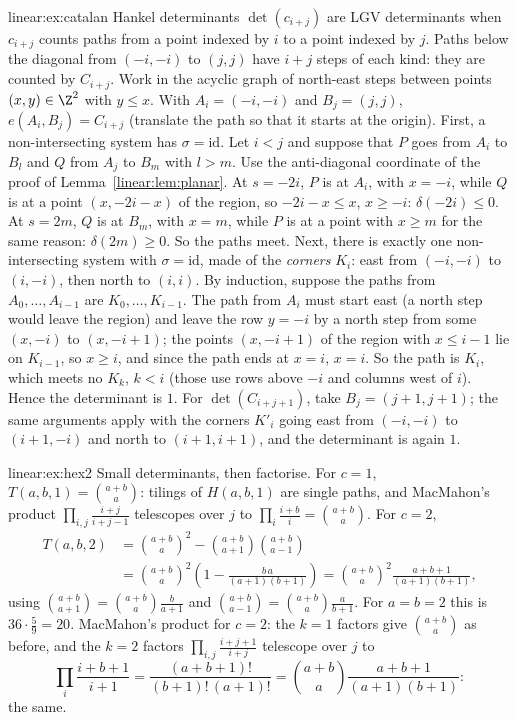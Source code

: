\begin{solution}{linear:ex:catalan}
\idea Hankel determinants $\det(c_{i+j})$ are LGV determinants when $c_{i+j}$ counts paths from a point indexed by $i$ to a
point indexed by $j$. Paths below the diagonal from $(-i,-i)$ to $(j,j)$ have $i+j$ steps of each kind: they are counted
by $C_{i+j}$.
\writeup Work in the acyclic graph of north-east steps between points $(x,y)\in\Z^2$ with $y\le x$. With $A_i=(-i,-i)$ and
$B_j=(j,j)$, $e(A_i,B_j)=C_{i+j}$ (translate the path so that it starts at the origin). First, a non-intersecting system
has $\sigma=\mathrm{id}$. Let $i<j$ and suppose that $P$ goes from $A_i$ to $B_l$ and $Q$ from $A_j$ to $B_m$ with $l>m$.
Use the anti-diagonal coordinate of the proof of Lemma~\ref{linear:lem:planar}. At $s=-2i$, $P$ is at $A_i$, with $x=-i$, while $Q$
is at a point $(x,-2i-x)$ of the region, so $-2i-x\le x$, $x\ge-i$: $\delta(-2i)\le0$. At $s=2m$, $Q$ is at $B_m$, with $x=m$,
while $P$ is at a point with $x\ge m$ for the same reason: $\delta(2m)\ge0$. So the paths meet. Next, there is exactly one
non-intersecting system with $\sigma=\mathrm{id}$, made of the \emph{corners} $K_i$: east from $(-i,-i)$ to $(i,-i)$, then north
to $(i,i)$. By induction, suppose the paths from $A_0,\dots,A_{i-1}$ are $K_0,\dots,K_{i-1}$. The path from $A_i$ must start
east (a north step would leave the region) and leave the row $y=-i$ by a north step from some $(x,-i)$ to $(x,-i+1)$; the
points $(x,-i+1)$ of the region with $x\le i-1$ lie on $K_{i-1}$, so $x\ge i$, and since the path ends at $x=i$, $x=i$. So
the path is $K_i$, which meets no $K_k$, $k<i$ (those use rows above $-i$ and columns west of $i$). Hence the
determinant is $1$. For $\det(C_{i+j+1})$, take $B_j=(j+1,j+1)$; the same arguments apply with the corners $K'_i$ going
east from $(-i,-i)$ to $(i+1,-i)$ and north to $(i+1,i+1)$, and the determinant is again $1$.
\end{solution}

\begin{solution}{linear:ex:hex2}
\idea Small determinants, then factorise.
\writeup For $c=1$, $T(a,b,1)=\binom{a+b}a$: tilings of $H(a,b,1)$ are single paths, and MacMahon's product
$\prod_{i,j}\frac{i+j}{i+j-1}$ telescopes over $j$ to $\prod_i\frac{i+b}i=\binom{a+b}a$. For $c=2$,
\[
\begin{aligned}T(a,b,2)&=\binom{a+b}a^2-\binom{a+b}{a+1}\binom{a+b}{a-1}\\&=\binom{a+b}a^2\left(1-\frac{b\,a}{(a+1)(b+1)}\right)=\binom{a+b}a^2\frac{a+b+1}{(a+1)(b+1)},\end{aligned}
\]
using $\binom{a+b}{a+1}=\binom{a+b}a\frac b{a+1}$ and $\binom{a+b}{a-1}=\binom{a+b}a\frac a{b+1}$. For $a=b=2$ this is
$36\cdot\frac59=20$. MacMahon's product for $c=2$: the $k=1$ factors give $\binom{a+b}a$ as before, and the $k=2$ factors
$\prod_{i,j}\frac{i+j+1}{i+j}$ telescope over $j$ to
\[
\prod_i\frac{i+b+1}{i+1}=\frac{(a+b+1)!}{(b+1)!\,(a+1)!}=\binom{a+b}a\frac{a+b+1}{(a+1)(b+1)}:
\]
the same.
\end{solution}

